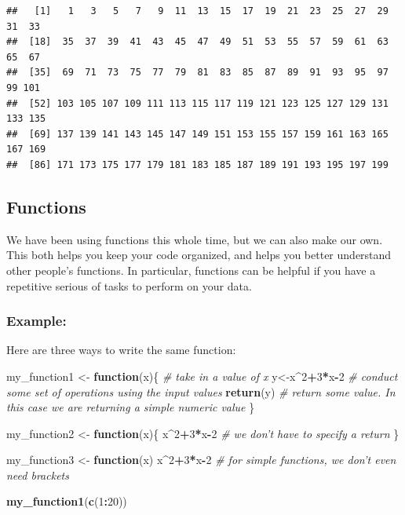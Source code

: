 \documentclass[]{article}
\newenvironment{Shaded}{\begin{snugshade}}{\end{snugshade}}
\newcommand{\KeywordTok}[1]{\textcolor[rgb]{0.13,0.29,0.53}{\textbf{#1}}}
\newcommand{\DecValTok}[1]{\textcolor[rgb]{0.00,0.00,0.81}{#1}}
\newcommand{\StringTok}[1]{\textcolor[rgb]{0.31,0.60,0.02}{#1}}
\newcommand{\CommentTok}[1]{\textcolor[rgb]{0.56,0.35,0.01}{\textit{#1}}}
\newcommand{\ControlFlowTok}[1]{\textcolor[rgb]{0.13,0.29,0.53}{\textbf{#1}}}
\newcommand{\OperatorTok}[1]{\textcolor[rgb]{0.81,0.36,0.00}{\textbf{#1}}}
\newcommand{\NormalTok}[1]{#1}
\begin{document}
\begin{verbatim}
##   [1]   1   3   5   7   9  11  13  15  17  19  21  23  25  27  29  31  33
##  [18]  35  37  39  41  43  45  47  49  51  53  55  57  59  61  63  65  67
##  [35]  69  71  73  75  77  79  81  83  85  87  89  91  93  95  97  99 101
##  [52] 103 105 107 109 111 113 115 117 119 121 123 125 127 129 131 133 135
##  [69] 137 139 141 143 145 147 149 151 153 155 157 159 161 163 165 167 169
##  [86] 171 173 175 177 179 181 183 185 187 189 191 193 195 197 199
\end{verbatim}

\clearpage

\subsection{Functions}\label{functions}

We have been using functions this whole time, but we can also make our
own. This both helps you keep your code organized, and helps you better
understand other people's functions. In particular, functions can be
helpful if you have a repetitive serious of tasks to perform on your
data.

\subsubsection{Example:}\label{example}

Here are three ways to write the same function:

\begin{Shaded}
\begin{Highlighting}[]
\NormalTok{my_function1 <-}\StringTok{ }\ControlFlowTok{function}\NormalTok{(x)\{ }\CommentTok{# take in a value of x}
\NormalTok{  y<-x}\OperatorTok{^}\DecValTok{2}\OperatorTok{+}\DecValTok{3}\OperatorTok{*}\NormalTok{x}\OperatorTok{-}\DecValTok{2} \CommentTok{# conduct some set of operations using the input values}
  \KeywordTok{return}\NormalTok{(y) }\CommentTok{# return some value. In this case we are returning a simple numeric value}
\NormalTok{\}}

\NormalTok{my_function2 <-}\StringTok{ }\ControlFlowTok{function}\NormalTok{(x)\{}
\NormalTok{  x}\OperatorTok{^}\DecValTok{2}\OperatorTok{+}\DecValTok{3}\OperatorTok{*}\NormalTok{x}\OperatorTok{-}\DecValTok{2} \CommentTok{# we don't have to specify a return}
\NormalTok{\}}

\NormalTok{my_function3 <-}\StringTok{ }\ControlFlowTok{function}\NormalTok{(x) x}\OperatorTok{^}\DecValTok{2}\OperatorTok{+}\DecValTok{3}\OperatorTok{*}\NormalTok{x}\OperatorTok{-}\DecValTok{2} \CommentTok{# for simple functions, we don't even need brackets}


\KeywordTok{my_function1}\NormalTok{(}\KeywordTok{c}\NormalTok{(}\DecValTok{1}\OperatorTok{:}\DecValTok{20}\NormalTok{))}
\end{Highlighting}
\end{Shaded}
\end{document}
